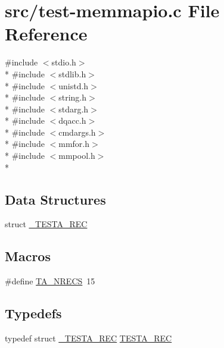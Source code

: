 \hypertarget{test-memmapio_8c}{\section{src/test-\/memmapio.c File Reference}
\label{test-memmapio_8c}
}
{\ttfamily \#include $<$stdio.\-h$>$}\\*
{\ttfamily \#include $<$stdlib.\-h$>$}\\*
{\ttfamily \#include $<$unistd.\-h$>$}\\*
{\ttfamily \#include $<$string.\-h$>$}\\*
{\ttfamily \#include $<$stdarg.\-h$>$}\\*
{\ttfamily \#include $<$dqacc.\-h$>$}\\*
{\ttfamily \#include $<$cmdargs.\-h$>$}\\*
{\ttfamily \#include $<$mmfor.\-h$>$}\\*
{\ttfamily \#include $<$mmpool.\-h$>$}\\*
\subsection*{Data Structures}
\begin{DoxyCompactItemize}
\item 
struct \hyperlink{struct___t_e_s_t_a___r_e_c}{\-\_\-\-T\-E\-S\-T\-A\-\_\-\-R\-E\-C}
\end{DoxyCompactItemize}
\subsection*{Macros}
\begin{DoxyCompactItemize}
\item 
\#define \hyperlink{test-memmapio_8c_a1fe547121f209c18227664f5fc0c9ecc}{T\-A\-\_\-\-N\-R\-E\-C\-S}~15
\end{DoxyCompactItemize}
\subsection*{Typedefs}
\begin{DoxyCompactItemize}
\item 
typedef struct \hyperlink{struct___t_e_s_t_a___r_e_c}{\-\_\-\-T\-E\-S\-T\-A\-\_\-\-R\-E\-C} \hyperlink{test-memmapio_8c_a0b621230f367bbb7d4a28d320e5f732c}{T\-E\-S\-T\-A\-\_\-\-R\-E\-C}
\end{DoxyCompactItemize}
